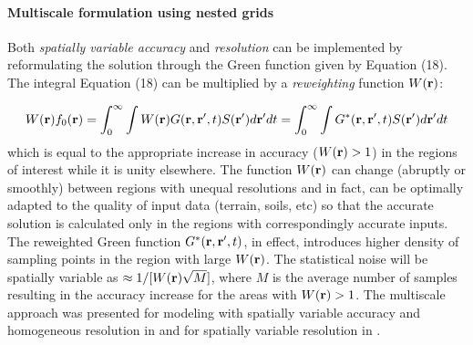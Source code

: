 \documentclass[fleqn,12pt,twoside]{article}
\begin{document}



\paragraph{Multiscale formulation using nested grids}

Both {\it spatially variable accuracy} and {\it resolution} can be
implemented by reformulating the  solution through the Green function
given by Equation (18).
The integral Equation (18) can be multiplied by a {\it reweighting }
 function  $W({\bf r})$:

\begin{equation}
W({\bf r}) f_0({\bf r})= \int_0^{\infty}\int 
W({\bf r})G({\bf r},{\bf r'},t)
  S({\bf r'})  d{\bf r'}dt =
 \int_0^{\infty}\int G^*({\bf r},{\bf r'},t)
 S({\bf r'})  d{\bf r'}dt
\end{equation}
 which is equal to the appropriate increase in accuracy ($W({\bf r})>1$)
 in the regions of interest while it is
  unity elsewhere. The function $W({\bf r})$ can change (abruptly or smoothly)
  between regions with unequal
 resolutions  and in fact, can be optimally adapted to the quality of
 input data (terrain, soils, etc) so that the accurate solution
 is calculated only in the regions with correspondingly accurate inputs.
 The reweighted Green function $G^*({\bf r},{\bf r'},t)$, in effect,
  introduces higher density of sampling points in the region with
 large $W({\bf r})$. The statistical noise will be spatially
 variable as
    $\approx 1/[W({\bf r})\sqrt{M}]$, where $M$ is the average number
 of samples  resulting in the accuracy increase for the areas
 with $W({\bf r}) > 1$.
The multiscale approach was presented for modeling with spatially variable 
accuracy and homogeneous resolution in \cite{mitvienna98} and
for spatially variable resolution in \cite{mitlle01}.
\end{document}
